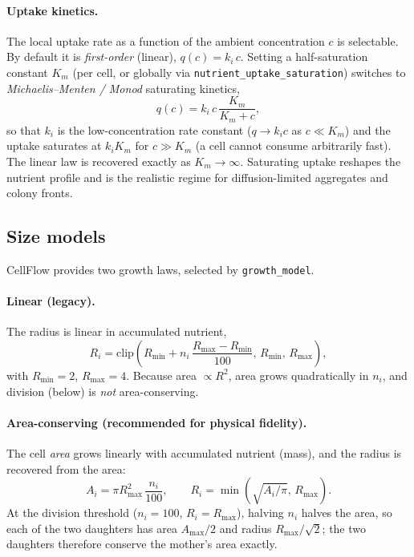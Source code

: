 \documentclass[11pt]{article}
\begin{document}
\paragraph{Uptake kinetics.} The local uptake rate as a function of the ambient
concentration $c$ is selectable. By default it is \emph{first-order} (linear),
$q(c)=k_i\,c$. Setting a half-saturation constant $K_m$ (per cell, or globally
via \texttt{nutrient\_uptake\_saturation}) switches to \emph{Michaelis--Menten /
Monod} saturating kinetics,
\begin{equation}
  q(c) = k_i\,c\,\frac{K_m}{K_m + c},
\end{equation}
so that $k_i$ is the low-concentration rate constant ($q\to k_i c$ as
$c\ll K_m$) and the uptake saturates at $k_i K_m$ for $c\gg K_m$ (a cell cannot
consume arbitrarily fast). The linear law is recovered exactly as
$K_m\to\infty$. Saturating uptake reshapes the nutrient profile and is the
realistic regime for diffusion-limited aggregates and colony fronts.

\subsection{Size models}
CellFlow provides two growth laws, selected by \texttt{growth\_model}.

\paragraph{Linear (legacy).} The radius is linear in accumulated nutrient,
\begin{equation}
  R_i = \mathrm{clip}\!\left(R_{\min} + n_i\,\frac{R_{\max}-R_{\min}}{100},\,
  R_{\min},\, R_{\max}\right),
\end{equation}
with $R_{\min}=2$, $R_{\max}=4$. Because area $\propto R^2$, area grows
quadratically in $n_i$, and division (below) is \emph{not} area-conserving.

\paragraph{Area-conserving (recommended for physical fidelity).} The cell
\emph{area} grows linearly with accumulated nutrient (mass), and the radius is
recovered from the area:
\begin{equation}
  A_i = \pi R_{\max}^2 \,\frac{n_i}{100}, \qquad
  R_i = \min\!\left(\sqrt{A_i/\pi},\, R_{\max}\right).
\end{equation}
At the division threshold ($n_i=100$, $R_i=R_{\max}$), halving $n_i$ halves the
area, so each of the two daughters has area $A_{\max}/2$ and radius
$R_{\max}/\sqrt{2}$; the two daughters therefore conserve the mother's area
exactly.
\end{document}
